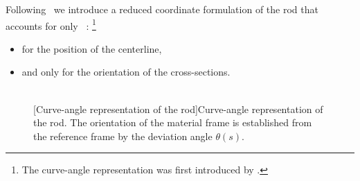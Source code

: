 Following~ we introduce a reduced coordinate formulation of the rod that accounts for only ~: \footnote{The curve-angle representation was first introduced by \cite{Langer1996}.}
\begin{itemize}
\item {} for the position of the centerline,
\item and only  for the orientation of the cross-sections.
\end{itemize}
\begin{figure}[t]
     		\centering
		\hspace{2.5cm}
		 \\
		\vspace{10pt}
		[Curve-angle representation of the rod]{Curve-angle representation of the rod. The orientation of the material frame is established from the reference frame by the deviation angle $\theta(s)$.}
		\label{fig:curve_angle}
\end{figure}


